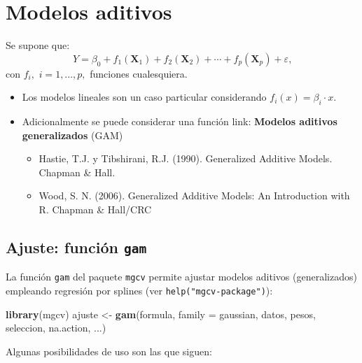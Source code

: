 \documentclass[]{book}
\newenvironment{Shaded}{\begin{snugshade}}{\end{snugshade}}
\newcommand{\KeywordTok}[1]{\textcolor[rgb]{0.13,0.29,0.53}{\textbf{#1}}}
\newcommand{\DataTypeTok}[1]{\textcolor[rgb]{0.13,0.29,0.53}{#1}}
\newcommand{\StringTok}[1]{\textcolor[rgb]{0.31,0.60,0.02}{#1}}
\newcommand{\NormalTok}[1]{#1}
\begin{document}
\section{Modelos aditivos}\label{modelos-aditivos}

Se supone que:
\[Y=\beta_{0}+f_{1}\left(  \mathbf{X}_{1}\right)  +f_{2}\left(  \mathbf{X}_{2}\right)  +\cdots+f_{p}\left(  \mathbf{X}_{p}\right)  +\varepsilon\text{,}\]
con \(f_{i},\) \(i=1,...,p,\) funciones cualesquiera.

\begin{itemize}
\item
  Los modelos lineales son un caso particular considerando
  \(f_{i}(x) = \beta_{i}·x\).
\item
  Adicionalmente se puede considerar una función link: \textbf{Modelos
  aditivos generalizados} (GAM)

  \begin{itemize}
  \item
    Hastie, T.J. y Tibshirani, R.J. (1990). Generalized Additive Models.
    Chapman \& Hall.
  \item
    Wood, S. N. (2006). Generalized Additive Models: An Introduction
    with R. Chapman \& Hall/CRC
  \end{itemize}
\end{itemize}

\subsection{\texorpdfstring{Ajuste: función
\texttt{gam}}{Ajuste: función gam}}\label{ajuste-funcion-gam}

La función \texttt{gam} del paquete \texttt{mgcv} permite ajustar
modelos aditivos (generalizados) empleando regresión por splines (ver
\texttt{help("mgcv-package")}):

\begin{Shaded}
\begin{Highlighting}[]
\KeywordTok{library}\NormalTok{(mgcv)}
\NormalTok{ajuste <-}\StringTok{ }\KeywordTok{gam}\NormalTok{(formula, }\DataTypeTok{family =}\NormalTok{ gaussian, datos, pesos, seleccion, na.action, ...)}
\end{Highlighting}
\end{Shaded}

Algunas posibilidades de uso son las que siguen:
\end{document}
